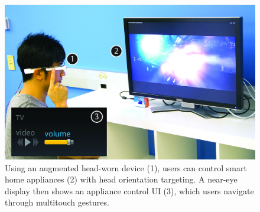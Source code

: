 \begin{figure}[t]
\centering
\includegraphics[width=1.0\columnwidth]{figures/teaser.jpg}
\caption{Using an augmented head-worn device (1), users can control smart home appliances (2) with head orientation targeting. A near-eye display then shows an appliance control UI (3), which users navigate through multitouch gestures.}
\label{fig:teaser}
\end{figure}









